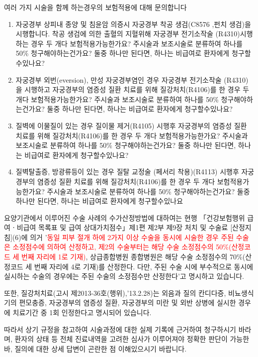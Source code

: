 \medskip
\begin{commentbox}{여러 가지 시술을 함께 하는경우의 보험적용에 대해 문의합니다}
\begin{enumerate}\tightlist
\item 자궁경부 상피내 종양 및 침윤암 의증시 자궁경부 착공 생검(C8576 ,펀치 생검)을 시행합니다. 착공 생검에 의한 출혈의 지혈위해 자궁경부 전기소작술 (R4310)시행하는 경우 두 개다 보험적용가능한가요? 주시술과 보조시술로 분류하여 하나를 50\% 청구해야하는건가요? 둘중 하나만 된다면, 하나는 비급여로 환자에게 청구할수있나요?
\item 자궁경부 외번(eversion), 만성 자궁경부염인 경우 자궁경부 전기소작술 (R4310)을 시행하고 자궁경부의 염증성 질환 치료를 위해 질강처치(R4106)를 한 경우 두 개다 보험적용가능한가요? 주시술과 보조시술로 분류하여 하나를 50\% 청구해야하는건가요? 둘중 하나만 된다면, 하나는 비급여로 환자에게 청구할수있나요?
\item 질벽에 이물질이 있는 경우 질이물 제거(R4105) 시행후 자궁경부의 염증성 질환 치료를 위해 질강처치(R4106)를 한 경우 두 개다 보험적용가능한가요? 주시술과 보조시술로 분류하여 하나를 50\% 청구해야하는건가요? 둘중 하나만 된다면, 하나는 비급여로 환자에게 청구할수있나요? 
\item 질벽탈출증, 방광류등이 있는 경우 질탈 교정술 (페서리 착용)(R4113) 시행후 자궁경부의 염증성 질환 치료를 위해 질강처치(R4106)를 한 경우 두 개다 보험적용가능한가요? 주시술과 보조시술로 분류하여 하나를 50\% 청구해야하는건가요? 둘중 하나만 된다면, 하나는 비급여로 환자에게 청구할수있나요
\end{enumerate}
요양기관에서 이루어진 수술 사례의 수가산정방법에 대하여는 현행 「건강보험행위 급여ㆍ비급여 목록표 및 급여 상대가치점수」제1편 제2부 제9장 처치 및 수술료 [산정지침](6)에 의거 '\textcolor{red}{동일 피부 절개 하에 2가지 이상 수술을 동시에 시술한 경우 주된 수술은 소정점수에 의하여 산정하고, 제2의 수술부터는 해당 수술 소정점수의 50\%(산정코드 세 번째 자리에 1로 기재)}, 상급종합병원\cntrdot{} 종합병원은 해당 수술 소정점수의 70\%(산정코드 세 번째 자리에 4로 기재)를 산정한다. 다만, 주된 수술 시에 부수적으로 동시에 실시하는 수술의 경우에는 주된 수술의 소정점수만 산정한다'고 명시하고 있습니다.\par 또한, 질강처치료(고시 제2013-36호(행위),'13.2.28)는 외음과 질의 칸디다증, 비뇨생식기의 편모충증, 자궁경부의 염증성 질환, 자궁경부의 미란 및 외반 상병에 실시한 경우에 치료기간 중 1회 인정한다고 명시되어 있습니다.
\par 따라서 상기 규정을 참고하여 시술과정에 대한 실제 기록에 근거하여 청구하시기 바라며, 환자의 상태 등 전체 진료내역을 고려한 심사가 이루어져야 정확한 판단이 가능한 바, 질의에 대한 상세 답변이 곤란한 점 이해있으시기 바랍니다. 
\end{commentbox}